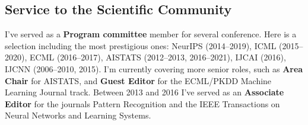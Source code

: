 \documentclass[a4paper,10pt]{article}
\begin{document}



\subsection*{Service to the Scientific Community}

I've served as a {\bf Program committee} member for several conference. 
Here is a selection including the most prestigious ones:
  NeurIPS (2014--2019),
  ICML (2015--2020),
  ECML (2016--2017),
  AISTATS (2012--2013, 2016--2021), 
  IJCAI (2016),
  IJCNN (2006--2010, 2015).
I'm currently covering more senior roles, such as {\bf Area Chair} for AISTATS, and {\bf Guest Editor} for the ECML/PKDD Machine Learning Journal track.
Between 2013 and 2016 I've served as an {\bf Associate Editor} for the journals Pattern Recognition and the IEEE Transactions on Neural Networks and Learning Systems.



\end{document}
